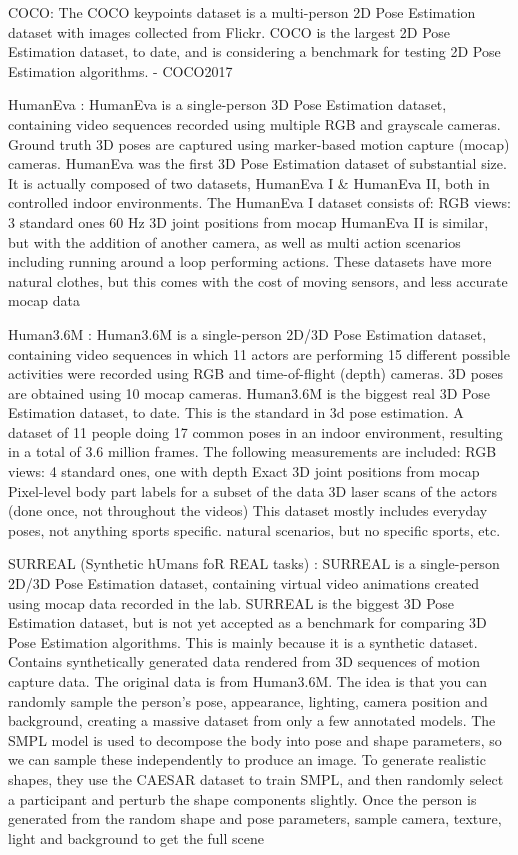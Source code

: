 COCO: The COCO keypoints dataset is a multi-person 2D Pose Estimation dataset with images collected
from Flickr. COCO is the largest 2D Pose Estimation dataset, to date, and is considering a benchmark
for testing 2D Pose Estimation algorithms.
- COCO2017

HumanEva : HumanEva is a single-person 3D Pose Estimation dataset, containing video sequences
recorded using multiple RGB and grayscale cameras. Ground truth 3D poses are captured using
marker-based motion capture (mocap) cameras. HumanEva was the first 3D Pose Estimation dataset of
substantial size.
It is actually composed of two datasets, HumanEva I & HumanEva II, both in controlled indoor environments.
The HumanEva I dataset consists of:
RGB views: 3 standard ones
60 Hz 3D joint positions from mocap
HumanEva II is similar, but with the addition of another camera, as well as multi action scenarios
including running around a loop performing actions. These datasets have more natural clothes, but
this comes with the cost of moving sensors, and less accurate mocap data

Human3.6M : Human3.6M is a single-person 2D/3D Pose Estimation dataset, containing video sequences
in which 11 actors are performing 15 different possible activities were recorded using RGB and
time-of-flight (depth) cameras. 3D poses are obtained using 10 mocap cameras. Human3.6M is the
biggest real 3D Pose Estimation dataset, to date.
This is the standard in 3d pose estimation. A dataset of 11 people doing 17 common poses in an
indoor environment, resulting in a total of 3.6 million frames. The following measurements are included:
RGB views: 4 standard ones, one with depth
Exact 3D joint positions from mocap
Pixel-level body part labels for a subset of the data
3D laser scans of the actors (done once, not throughout the videos)
This dataset mostly includes everyday poses, not anything sports specific. natural scenarios, but no
specific sports, etc.


SURREAL (Synthetic hUmans foR REAL tasks) : SURREAL is a single-person 2D/3D Pose Estimation dataset, containing virtual video
animations created using mocap data recorded in the lab. SURREAL is the biggest 3D Pose Estimation
dataset, but is not yet accepted as a benchmark for comparing 3D Pose Estimation algorithms. This
is mainly because it is a synthetic dataset.
Contains synthetically generated data rendered from 3D sequences of motion capture data. The original data is from Human3.6M.
The idea is that you can randomly sample the person’s pose, appearance, lighting, camera position and background, creating a massive dataset from only a few annotated models. The SMPL model is used to decompose the body into pose and shape parameters, so we can sample these independently to produce an image. To generate realistic shapes, they use the CAESAR dataset to train SMPL, and then randomly select a participant and perturb the shape components slightly.
Once the person is generated from the random shape and pose parameters, sample camera, texture, light and background to get the full scene


